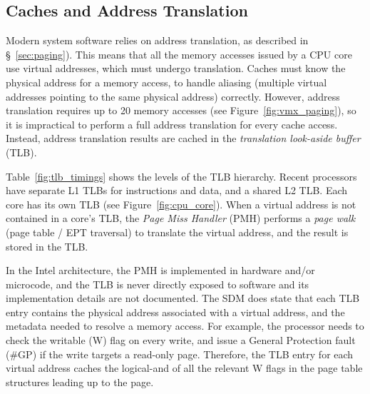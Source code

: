 \subsection{Caches and Address Translation}
\label{sec:tlbs}

Modern system software relies on address translation, as described in
\S~\ref{sec:paging}). This means that all the memory accesses issued by a CPU
core use virtual addresses, which must undergo translation. Caches must know
the physical address for a memory access, to handle aliasing (multiple virtual
addresses pointing to the same physical address) correctly. However, address
translation requires up to 20 memory accesses (see
Figure~\ref{fig:vmx_paging}), so it is impractical to perform a full address
translation for every cache access. Instead, address translation results are
cached in the \textit{translation look-aside buffer} (TLB).

Table~\ref{fig:tlb_timings} shows the levels of the TLB hierarchy. Recent
processors have separate L1 TLBs for instructions and data, and a shared L2
TLB. Each core has its own TLB (see Figure~\ref{fig:cpu_core}). When a virtual
address is not contained in a core's TLB, the \textit{Page Miss Handler} (PMH)
performs a \textit{page walk} (page table / EPT traversal) to translate the
virtual address, and the result is stored in the TLB.

\begin{table}[hbt]
  \caption{
    Approximate sizes and access times for each level in the TLB hierarchy,
    from \cite{7zip2014haswell}.
  }
  \label{fig:tlb_timings}
\end{table}


In the Intel architecture, the PMH is implemented in hardware and/or microcode,
and the TLB is never directly exposed to software and its implementation
details are not documented.  The SDM does state that each TLB entry contains
the physical address associated with a virtual address, and the metadata needed
to resolve a memory access. For example, the processor needs to check the
writable (W) flag on every write, and issue a General Protection fault (\#GP)
if the write targets a read-only page.  Therefore, the TLB entry for each
virtual address caches the logical-and of all the relevant W flags in the page
table structures leading up to the page.

